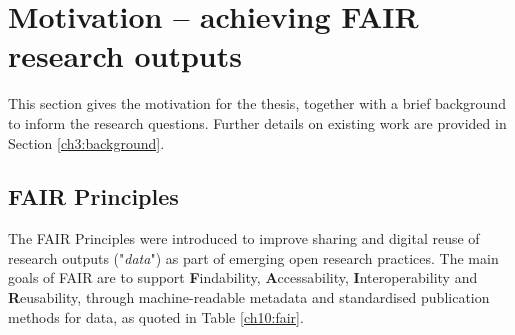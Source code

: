 \section{Motivation -- achieving FAIR research outputs}
\label{ch10:motivation}

This section gives the motivation for the thesis, together with a brief background to inform the  research questions. Further details on existing work are provided in Section \vref{ch3:background}.

\subsection{FAIR Principles}
\label{ch10:fair-principles}

The \acrshort{FAIR} Principles \cite{Wilkinson 2016} were introduced to improve sharing and digital reuse of research outputs ("\emph{data}") as part of emerging open research practices. The main goals of FAIR are to support \textbf{F}indability, \textbf{A}ccessability, \textbf{I}nteroperability and \textbf{R}eusability, through machine-readable metadata and standardised publication methods for data, as quoted in Table \vref{ch10:fair}.

